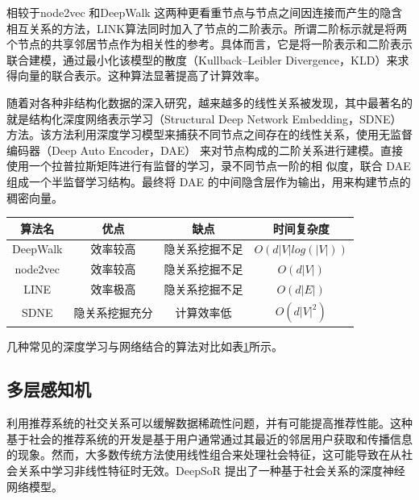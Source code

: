 相较于node2vec 和DeepWalk 这两种更看重节点与节点之间因连接而产生的隐含相互关系的方法，LINK算法同时加入了节点的二阶表示。所谓二阶标示就是将两个节点的共享邻居节点作为相关性的参考。具体而言，它是将一阶表示和二阶表示联合建模，通过最小化该模型的散度（Kullback–Leibler Divergence，KLD）\cite{van2014renyi}来求得向量的联合表示。这种算法显著提高了计算效率。

随着对各种非结构化数据的深入研究，越来越多的线性关系被发现，其中最著名的就是结构化深度网络表示学习（Structural Deep Network Embedding，SDNE）方法。该方法利用深度学习模型来捕获不同节点之间存在的线性关系，使用无监督编码器（Deep Auto Encoder，DAE）\cite{schmidhuber2015deep} 来对节点构成的二阶关系进行建模。直接使用一个拉普拉斯矩阵进行有监督的学习，录不同节点一阶的相
似度，联合 DAE 组成一个半监督学习结构。最终将 DAE 的中间隐含层作为输出，用来构建节点的稠密向量。 


\begin{table}[htbp]
    \centering 
    \vspace {-2.5mm}
    \begin{center}
    \begin{tabular}{cccc}
    \toprule
    算法名& 优点& 缺点& 时间复杂度\\
    \hline
    DeepWalk& 效率较高& 隐关系挖掘不足& $O(d|V|log(|V|))$\\
    \hline
    node2vec& 效率较高& 隐关系挖掘不足& $O(d|V|)$\\
    \hline
    LINE& 效率极高& 隐关系挖掘不足& $O(d|E|)$\\
    \hline
    SDNE& 隐关系挖掘充分& 计算效率低& $O(d|V|^2)$\\
    \bottomrule
    \end{tabular}
    \label{tab1}
    \end{center}
    \end{table}

几种常见的深度学习与网络结合的算法对比如表\ref{tab1}所示。

\subsection{多层感知机}
利用推荐系统的社交关系可以缓解数据稀疏性问题，并有可能提高推荐性能。这种基于社会的推荐系统的开发是基于用户通常通过其最近的邻居用户获取和传播信息的现象。然而，大多数传统方法使用线性组合来处理社会特征，这可能导致在从社会关系中学习非线性特征时无效。DeepSoR\cite{fan2018deep} 提出了一种基于社会关系的深度神经网络模型。

